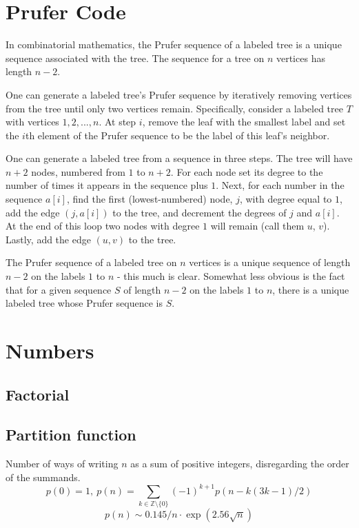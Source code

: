 \section{Prufer Code}
In combinatorial mathematics, the Prufer sequence of a labeled tree is a unique sequence associated with the tree. The sequence for a tree on $n$ vertices has length $n-2$.

One can generate a labeled tree's Prufer sequence by iteratively removing vertices from the tree until only two vertices remain. Specifically, consider a labeled tree $T$ with vertices ${1, 2, ..., n}$. At step $i$, remove the leaf with the smallest label and set the $i$th element of the Prufer sequence to be the label of this leaf's neighbor.

One can generate a labeled tree from a sequence in three steps. The tree will have $n+2$ nodes, numbered from $1$ to $n+2$. For each node set its degree to the number of times it appears in the sequence plus $1$. Next, for each number in the sequence $a[i]$, find the first (lowest-numbered) node, $j$, with degree equal to $1$, add the edge $(j, a[i])$ to the tree, and decrement the degrees of $j$ and $a[i]$. At the end of this loop two nodes with degree $1$ will remain (call them $u$, $v$). Lastly, add the edge $(u,v)$ to the tree.

The Prufer sequence of a labeled tree on $n$ vertices is a unique sequence of length $n-2$ on the labels $1$ to $n$ - this much is clear. Somewhat less obvious is the fact that for a given sequence $S$ of length $n-2$ on the labels $1$ to $n$, there is a unique labeled tree whose Prufer sequence is $S$.

\section{Numbers}
	\subsection{Factorial}
		

  \subsection{Partition function}
		Number of ways of writing $n$ as a sum of positive integers, disregarding the order of the summands.
		\[ p(0) = 1,\ p(n) = \sum_{k \in \mathbb Z \setminus \{0\}}{(-1)^{k+1} p(n - k(3k-1) / 2)} \]
		\[ p(n) \sim 0.145 / n \cdot \exp(2.56 \sqrt{n}) \]

